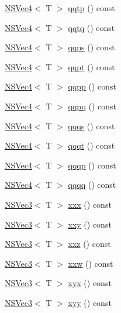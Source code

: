 \begin{DoxyCompactItemize}
\item 
\hyperlink{structNSVec4}{N\-S\-Vec4}$<$ T $>$ \hyperlink{structNSVec4_a3f39a9fb7d32276cb92d9e44314230de}{qqtp} () const 
\item 
\hyperlink{structNSVec4}{N\-S\-Vec4}$<$ T $>$ \hyperlink{structNSVec4_a18bb9b22fdfd259003da01a758c6a194}{qqtq} () const 
\item 
\hyperlink{structNSVec4}{N\-S\-Vec4}$<$ T $>$ \hyperlink{structNSVec4_a1f2f35d92bf4cba532b6ae4cb50d4cc3}{qqps} () const 
\item 
\hyperlink{structNSVec4}{N\-S\-Vec4}$<$ T $>$ \hyperlink{structNSVec4_aa16e7101bc7cb10aa1e26da2915a3740}{qqpt} () const 
\item 
\hyperlink{structNSVec4}{N\-S\-Vec4}$<$ T $>$ \hyperlink{structNSVec4_acfee0b40dfac033b5c9c2fb869f715b9}{qqpp} () const 
\item 
\hyperlink{structNSVec4}{N\-S\-Vec4}$<$ T $>$ \hyperlink{structNSVec4_a40d97c14382f936b5a871cf25fc2efc5}{qqpq} () const 
\item 
\hyperlink{structNSVec4}{N\-S\-Vec4}$<$ T $>$ \hyperlink{structNSVec4_a349ed82685dcecdb7d5808220b2cba9f}{qqqs} () const 
\item 
\hyperlink{structNSVec4}{N\-S\-Vec4}$<$ T $>$ \hyperlink{structNSVec4_a49248fd5f145078a20a01488b919a368}{qqqt} () const 
\item 
\hyperlink{structNSVec4}{N\-S\-Vec4}$<$ T $>$ \hyperlink{structNSVec4_a05937dd4e23accff63f89224dbbeab02}{qqqp} () const 
\item 
\hyperlink{structNSVec4}{N\-S\-Vec4}$<$ T $>$ \hyperlink{structNSVec4_af2aa9ddf1dd91cf5762471ecb8fa83f3}{qqqq} () const 
\item 
\hyperlink{structNSVec3}{N\-S\-Vec3}$<$ T $>$ \hyperlink{structNSVec4_ae3e8921966bc7f5f73bad3daaaf2c603}{xxx} () const 
\item 
\hyperlink{structNSVec3}{N\-S\-Vec3}$<$ T $>$ \hyperlink{structNSVec4_aab5aeb7f0830a0a22434b6e4f09e8da1}{xxy} () const 
\item 
\hyperlink{structNSVec3}{N\-S\-Vec3}$<$ T $>$ \hyperlink{structNSVec4_a1efdb55f4c550a2e8105575a74db5728}{xxz} () const 
\item 
\hyperlink{structNSVec3}{N\-S\-Vec3}$<$ T $>$ \hyperlink{structNSVec4_aabc785e3dc7ebe5666d80ff76ca528fd}{xxw} () const 
\item 
\hyperlink{structNSVec3}{N\-S\-Vec3}$<$ T $>$ \hyperlink{structNSVec4_a057957e316cd1f3165d812eba4b81bf8}{xyx} () const 
\item 
\hyperlink{structNSVec3}{N\-S\-Vec3}$<$ T $>$ \hyperlink{structNSVec4_a51d3235d1ab90a0be82bed974b10873f}{xyy} () const 

\end{DoxyCompactItemize}
